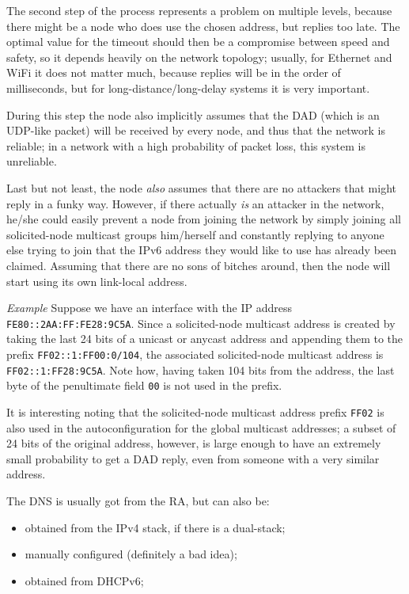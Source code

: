 The second step of the process represents a problem on multiple levels, because there might be a node who does use the chosen address, but replies too late. The optimal value for the timeout should then be a compromise between speed and safety, so it depends heavily on the network topology; usually, for Ethernet and WiFi it does not matter much, because replies will be in the order of milliseconds, but for long-distance/long-delay systems it is very important.

During this step the node also implicitly assumes that the DAD (which is an UDP-like packet) will be received by every node, and thus that the network is reliable; in a network with a high probability of packet loss, this system is unreliable.

Last but not least, the node \textit{also} assumes that there are no attackers that might reply in a funky way. However, if there actually \textit{is} an attacker in the network, he/she could easily prevent a node from joining the network by simply joining all solicited-node multicast groups him/herself and constantly replying to anyone else trying to join that the IPv6 address they would like to use has already been claimed. Assuming that there are no sons of bitches around, then the node will start using its own link-local address.

\vspace{0.5em}

\emph{Example} Suppose we have an interface with the IP address \texttt{FE80::2AA:FF:FE28:9C5A}. Since a solicited-node multicast address is created by taking the last 24 bits of a unicast or anycast address and appending them to the prefix \texttt{FF02::1:FF00:0/104}, the associated solicited-node multicast address is \texttt{FF02::1:FF28:9C5A}. Note how, having taken 104 bits from the address, the last byte of the penultimate field \texttt{00} is not used in the prefix.

It is interesting noting that the solicited-node multicast address prefix \texttt{FF02} is also used in the autoconfiguration for the global multicast addresses; a subset of 24 bits of the original address, however, is large enough to have an extremely small probability to get a DAD reply, even from someone with a very similar address.

\vspace{0.5em}

The DNS is usually got from the RA, but can also be:

\begin{itemize}
    \item obtained from the IPv4 stack, if there is a dual-stack;
    \item manually configured (definitely a bad idea);
    \item obtained from DHCPv6;
\end{itemize}

